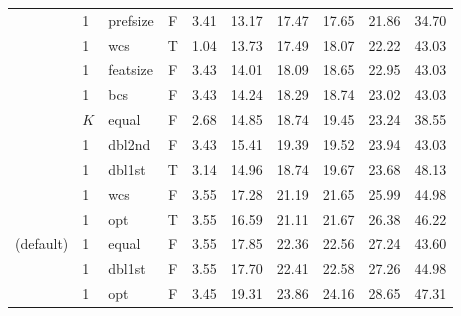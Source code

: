 \begin{table}[ht]
\begin{minipage}{\textwidth}
\begin{tabular}{lllcrrrrrr}
  & 1 & prefsize & F & 3.41 & 13.17 & 17.47 & 17.65 & 21.86 & 34.70 \\ 
  & 1 & wcs & T & 1.04 & 13.73 & 17.49 & 18.07 & 22.22 & 43.03 \\ 
  & 1 & featsize & F & 3.43 & 14.01 & 18.09 & 18.65 & 22.95 & 43.03 \\ 
  & 1 & bcs & F & 3.43 & 14.24 & 18.29 & 18.74 & 23.02 & 43.03 \\ 
  & $K$ & equal & F & 2.68 & 14.85 & 18.74 & 19.45 & 23.24 & 38.55 \\ 
  & 1 & dbl2nd & F & 3.43 & 15.41 & 19.39 & 19.52 & 23.94 & 43.03 \\ 
  & 1 & dbl1st & T & 3.14 & 14.96 & 18.74 & 19.67 & 23.68 & 48.13 \\ 
  & 1 & wcs & F & 3.55 & 17.28 & 21.19 & 21.65 & 25.99 & 44.98 \\ 
  & 1 & opt & T & 3.55 & 16.59 & 21.11 & 21.67 & 26.38 & 46.22 \\ 
(default) & 1 & equal & F & 3.55 & 17.85 & 22.36 & 22.56 & 27.24 & 43.60 \\ 
  & 1 & dbl1st & F & 3.55 & 17.70 & 22.41 & 22.58 & 27.26 & 44.98 \\ 
  & 1 & opt & F & 3.45 & 19.31 & 23.86 & 24.16 & 28.65 & 47.31 \\ 
 \bottomrule
\end{tabular}
\end{minipage}
\end{table}
